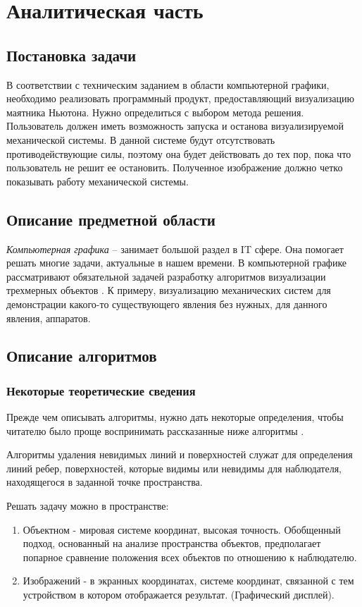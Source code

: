 \chapter{Аналитическая часть}

\section{Постановка задачи}
В соответствии с техническим заданием в области компьютерной графики, необходимо реализовать программный продукт, предоставляющий визуализацию маятника Ньютона. Нужно определиться с выбором метода решения. Пользователь должен иметь возможность запуска и останова визуализируемой механической системы. В данной системе будут отсутствовать противодействующие силы, поэтому она будет действовать до тех пор, пока что пользователь не решит ее остановить. Полученное изображение должно четко показывать работу механической системы.

\section {Описание предметной области}
\textit{Компьютерная графика } -- занимает большой раздел в IT сфере. Она помогает решать многие задачи, актуальные в нашем времени. В компьютерной графике рассматривают обязательной задачей разработку алгоритмов визуализации трехмерных объектов \cite{tr2}. К примеру, визуализацию механических систем для демонстрации какого-то существующего явления без нужных, для данного явления, аппаратов.

\section {Описание алгоритмов}

\subsection {Некоторые теоретические сведения}

Прежде чем описывать алгоритмы, нужно дать некоторые определения, чтобы читателю было проще воспринимать рассказанные ниже алгоритмы \cite{tr2}.

Алгоритмы удаления невидимых линий и поверхностей служат для определения линий ребер, поверхностей, которые видимы или невидимы для наблюдателя, находящегося в заданной точке пространства.

Решать задачу можно в пространстве:
\begin{enumerate}
	\item Объектном - мировая системе координат, высокая точность. Обобщенный подход, основанный на анализе пространства объектов, предполагает попарное сравнение положения всех объектов по отношению к наблюдателю.
	\item Изображений - в экранных координатах, системе координат, связанной с тем устройством в котором отображается результат. (Графический дисплей).
\end{enumerate}

